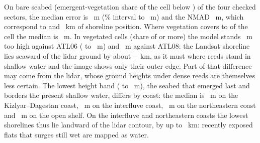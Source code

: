On bare seabed (emergent-vegetation share of the cell below ) of the four checked sectors, the median error is ~m (\% interval  to ~m) and the NMAD ~m, which correspond to  and ~km of shoreline position. Where vegetation covers  to  of the cell the median is ~m. In vegetated cells (share of  or more) the model stands ~m too high against ATL06 ( to ~m) and ~m against ATL08: the Landsat shoreline lies seaward of the lidar ground by about --~km, as it must where reeds stand in shallow water and the image shows only their outer edge. Part of that difference may come from the lidar, whose ground heights under dense reeds are themselves less certain. The lowest height band ( to ~m), the seabed that emerged last and borders the present shallow water, differs by coast: the median is ~m on the Kizlyar--Dagestan coast, ~m on the interfluve coast, ~m on the northeastern coast and ~m on the open shelf. On the interfluve and northeastern coasts the lowest shorelines thus lie landward of the lidar contour, by up to ~km: recently exposed flats that surges still wet are mapped as water.

